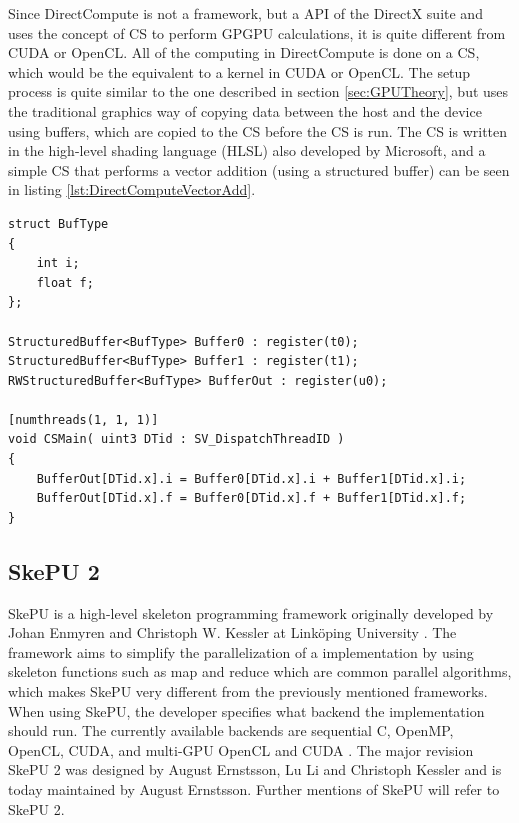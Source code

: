 Since DirectCompute is not a framework, but a API of the DirectX suite and uses the concept of CS to perform GPGPU calculations, it is quite different from CUDA or OpenCL. All of the computing in DirectCompute is done on a CS, which would be the equivalent to a kernel in CUDA or OpenCL. The setup process is quite similar to the one described in section \ref{sec:GPUTheory}, but uses the traditional graphics way of copying data between the host and the device using buffers, which are copied to the CS before the CS is run. The CS is written in the high-level shading language (HLSL) also developed by Microsoft, and a simple CS that performs a vector addition (using a structured buffer) can be seen in listing \ref{lst:DirectComputeVectorAdd}.

\begin{lstlisting}[caption={DirectCompute vector addition CS}, label={lst:DirectComputeVectorAdd}, frame=single] 
struct BufType
{
    int i;
    float f; 
};

StructuredBuffer<BufType> Buffer0 : register(t0);
StructuredBuffer<BufType> Buffer1 : register(t1);
RWStructuredBuffer<BufType> BufferOut : register(u0);

[numthreads(1, 1, 1)]
void CSMain( uint3 DTid : SV_DispatchThreadID )
{
    BufferOut[DTid.x].i = Buffer0[DTid.x].i + Buffer1[DTid.x].i;
    BufferOut[DTid.x].f = Buffer0[DTid.x].f + Buffer1[DTid.x].f;
}

\end{lstlisting}



\subsection{SkePU 2}
SkePU is a high-level skeleton programming framework originally developed by Johan Enmyren and Christoph W. Kessler at Linköping University \cite{enmyren2010skepu}. The framework aims to simplify the parallelization of a implementation by using skeleton functions such as map and reduce which are common parallel algorithms, which makes SkePU very different from the previously mentioned frameworks. When using SkePU, the developer specifies what backend the implementation should run. The currently available backends are sequential C, OpenMP, OpenCL, CUDA, and multi-GPU OpenCL and CUDA \cite{LiUSkePU}. The major revision SkePU 2 was designed by August Ernstsson, Lu Li and Christoph Kessler and is today maintained by August Ernstsson. Further mentions of SkePU will refer to SkePU 2.

